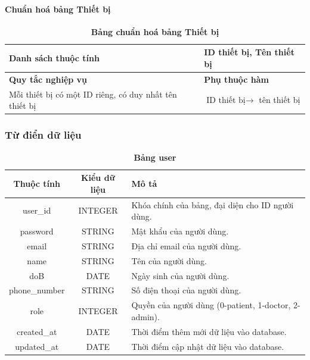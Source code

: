 \paragraph{Chuẩn hoá bảng Thiết bị}
\mbox{}

\begin{table}[H]
  \caption{\bfseries \fontsize{12pt}{0pt}\selectfont Bảng chuẩn hoá bảng Thiết bị}
  \centering
  \begin{tabularx}{0.9\textwidth}{|X|X|}
    \hline
    \textbf{Danh sách thuộc tính} & ID thiết bị, Tên thiết bị \\ %
    \hline
    \textbf{Quy tắc nghiệp vụ} & \textbf{Phụ thuộc hàm} \\
    \hline
    Mỗi thiết bị có một ID riêng, có duy nhất tên thiết bị & \parbox[t]{\linewidth}{$\text{ID thiết bị} \rightarrow$ tên thiết bị} \\
    \hline
     \\
     \\
    \hline
  \end{tabularx}
\end{table}




\subsubsection{Từ điển dữ liệu}



\begin{table}[H]
  \caption{\bfseries \fontsize{12pt}{0pt}\selectfont Bảng user}
  \centering
  \begin{tabularx}{0.9\textwidth}{|c|c|X|}
    \hline
    \textbf{Thuộc tính} & \textbf{Kiểu dữ liệu} & \textbf{Mô tả} \\
    \hline
    user\_id & INTEGER & Khóa chính của bảng, đại diện cho ID người dùng. \\
    \hline
    password & STRING & Mật khẩu của người dùng. \\
    \hline
    email & STRING & Địa chỉ email của người dùng. \\
    \hline
    name & STRING & Tên của người dùng. \\
    \hline
    doB & DATE & Ngày sinh của người dùng. \\
    \hline
    phone\_number & STRING & Số điện thoại của người dùng. \\
    \hline
    role & INTEGER & Quyền của người dùng (0-patient, 1-doctor, 2-admin). \\
    \hline
    created\_at & DATE & Thời điểm thêm mới dữ liệu vào database. \\
    \hline
    updated\_at & DATE & Thời điểm cập nhật dữ liệu vào database. \\
    \hline
    
  \end{tabularx}
\end{table}

